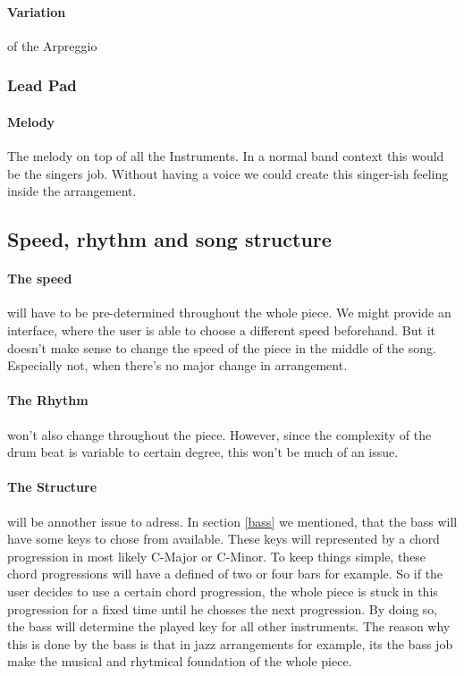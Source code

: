 \documentclass[titlepage, a4paper, 11pt]{scrartcl}
\begin{document}
\paragraph{Variation} of the Arpreggio

\subsubsection{Lead Pad}

\paragraph{Melody} The melody on top of all the Instruments. In a normal band context this would be the singers job. Without having a voice we could create this singer-ish feeling inside the arrangement.

\subsection{Speed, rhythm and song structure}

\paragraph{The speed} will have to be pre-determined throughout the whole piece. We might provide an interface, where the user is able to choose a different speed beforehand.
But it doesn't make sense to change the speed of the piece in the middle of the song. Especially not, when there's no major change in arrangement.

\paragraph{The Rhythm} won't also change throughout the piece. However, since the complexity of the drum beat is variable to certain degree,
this won't be much of an issue.

\paragraph{The Structure} will be annother issue to adress. In section \ref{bass} we mentioned, that the bass will have some keys to chose from available.
These keys will represented by a chord progression in most likely C-Major or C-Minor. To keep things simple, these chord progressions will
have a defined of two or four bars for example. So if the user decides to use a certain chord progression, the whole piece is stuck in this progression
for a fixed time until he chosses the next progression. By doing so, the bass will determine the played key for all other instruments.
The reason why this is done by the bass is that in jazz arrangements for example, its the bass job make the musical and rhytmical foundation of the whole piece.
\end{document}
